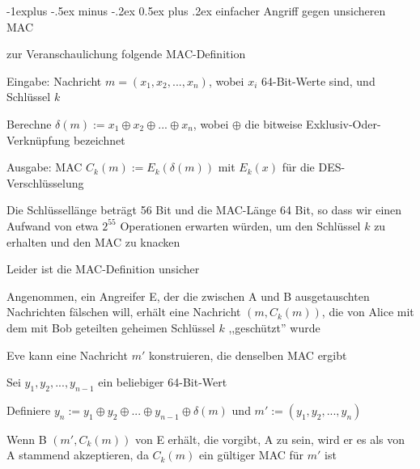 \documentclass[a4paper]{article}
\makeatletter
\renewcommand{\subsection}{\@startsection{subsection}{2}{0mm}%
 {-1explus -.5ex minus -.2ex}%
 {0.5ex plus .2ex}%
 {\normalfont\normalsize\bfseries}}
\makeatother
\begin{document}
\begin{multicols}{3}
      \subsection{einfacher Angriff gegen unsicheren MAC}
      \begin{itemize*}
            \item zur Veranschaulichung folgende MAC-Definition
            \begin{itemize*}
                  \item Eingabe: Nachricht $m=(x_1,x_2,...,x_n)$, wobei $x_i$ 64-Bit-Werte sind, und Schlüssel $k$
                  \item Berechne $\delta(m):= x_1\oplus x_2\oplus...\oplus x_n$, wobei $\oplus$ die bitweise Exklusiv-Oder-Verknüpfung bezeichnet
                  \item Ausgabe: MAC $C_k(m):= E_k(\delta(m))$ mit $E_k(x)$ für die DES-Verschlüsselung
            \end{itemize*}
            \item Die Schlüssellänge beträgt 56 Bit und die MAC-Länge 64 Bit, so dass wir einen Aufwand von etwa $2^{55}$ Operationen erwarten würden, um den Schlüssel $k$ zu erhalten und den MAC zu knacken %
            \item Leider ist die MAC-Definition unsicher
            \begin{itemize*}
                  \item Angenommen, ein Angreifer E, der die zwischen A und B ausgetauschten Nachrichten fälschen will, erhält eine Nachricht $(m,C_k(m))$, die von Alice mit dem mit Bob geteilten geheimen Schlüssel $k$ ,,geschützt'' wurde
                  \item Eve kann eine Nachricht $m'$ konstruieren, die denselben MAC ergibt
                  \item Sei $y_1,y_2,...,y_{n-1}$ ein beliebiger 64-Bit-Wert
                  \item Definiere $y_n:= y_1\oplus y_2\oplus...\oplus y_{n-1}\oplus \delta(m)$ und $m':=(y_1,y_2,...,y_n)$
                  \item Wenn B $(m',C_k(m))$ von E erhält, die vorgibt, A zu sein, wird er es als von A stammend akzeptieren, da $C_k(m)$ ein gültiger MAC für $m'$ ist
            \end{itemize*}
      \end{itemize*}


\end{multicols}
\end{document}
